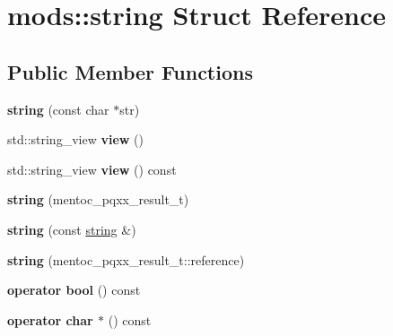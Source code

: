 \hypertarget{structmods_1_1string}{}\section{mods\+:\+:string Struct Reference}
\label{structmods_1_1string}
\subsection*{Public Member Functions}
\begin{DoxyCompactItemize}
\item 
\mbox{\label{structmods_1_1string_a454549cb11a5b2d3fe796b0c3b8ce1a5}} 
{\bfseries string} (const char $\ast$str)
\item 
\mbox{\label{structmods_1_1string_aa0a37ad63a6480698f0c25f1f8c2fab7}} 
std\+::string\+\_\+view {\bfseries view} ()
\item 
\mbox{\label{structmods_1_1string_a9fa2da92ceb6944f56bd9dc9ca7bdaf9}} 
std\+::string\+\_\+view {\bfseries view} () const
\item 
\mbox{\label{structmods_1_1string_a71746cd783d4a61ba60a92978d192d55}} 
{\bfseries string} (mentoc\+\_\+pqxx\+\_\+result\+\_\+t)
\item 
\mbox{\label{structmods_1_1string_a3dca0961f13b4ef7b254ef2cd9a4f027}} 
{\bfseries string} (const \hyperlink{structmods_1_1string}{string} \&)
\item 
\mbox{\label{structmods_1_1string_aee8b93b2332c5b12672159c75f6d7f97}} 
{\bfseries string} (mentoc\+\_\+pqxx\+\_\+result\+\_\+t\+::reference)
\item 
\mbox{\label{structmods_1_1string_a5a654e32cd893d9053ba4ffd5ea64920}} 
{\bfseries operator bool} () const
\item 
\mbox{\label{structmods_1_1string_a78f0d994fa4319d8d3a8d2eb4eaa5883}} 
{\bfseries operator char $\ast$} () const
\item 
\mbox{\label{structmods_1_1string_a46a4d77111fa413334cab692a441a9c2}} 

\end{DoxyCompactItemize}
